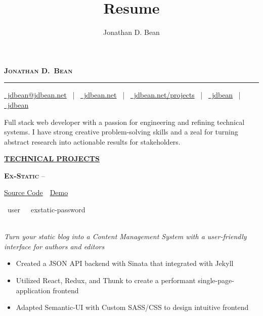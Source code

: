 \documentclass[11pt,letterpaper,english]{article}
\title{Resume}
\author{Jonathan D. Bean}
\date{}
\begin{document}
\label{Header}
\vspace*{-40pt}
\begin{singlespace}
\begin{center}
\textsc{\textbf{\LARGE Jonathan D.\ Bean}}
\vspace{3pt}
\hrule height 1pt
\vspace{4pt}
\small
\href{mailto:jdbean@jdbean.net}{\color{black}\faEnvelope~jdbean@jdbean.net}
~|~
\href{https://jdbean.net}{\color{black}\faGlobe~jdbean.net}
~|~
\href{https://jdbean.net/projects}{\color{black}\faEye~jdbean.net/projects}
~|~
\href{https://github.com/jdbean}{\color{black}\faGithub~jdbean}
~|~
\href{https://gitlab.com/jdbean}{\color{black}\faGitlab~jdbean}\\
\small
\end{center}
\end{singlespace}

\label{Description}
\vspace{-12pt}
\begin{changemargin}{0.7cm}{0.7cm}
Full stack web developer with a passion for engineering and refining technical systems. I have strong creative problem-solving skills and a zeal for turning abstract research into actionable results for stakeholders.
\end{changemargin}

\label{Technical Projects}
\underline{\textbf{\textsc{\large TECHNICAL PROJECTS}}}{\large \par}
\smallskip

\textbf{\textsc{Ex-Static}} 
--\begin{small}
\href{https://github.com/jdbean/Ex-Static}{Source Code}~\color{darkgray}{|}~\href{https://office.johannabearman.duckdns.org}{Demo}
\end{small}
\begin{scriptsize}
\color{gray}
\faUser~user~~\faKey~exstatic-password
\end{scriptsize}\\
\textit{Turn your static blog into a Content Management System with a user-friendly interface for authors and editors}
\begin{itemize}
\item Created a JSON API backend with Sinata that integrated with Jekyll
\item Utilized React, Redux, and Thunk to create a performant single-page-application frontend
\item Adapted Semantic-UI with Custom SASS/CSS to design intuitive frontend
\end{itemize}
\smallskip
\end{document}
